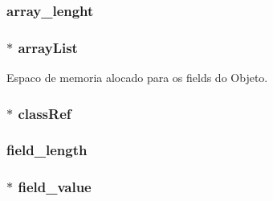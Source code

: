 \subsubsection[{array\+\_\+lenght}]{ array\+\_\+lenght}\label{struct_object__t_ae05c8fe9c6252af97d298b2a2cd87e6c}
\hypertarget{struct_object__t_a11a8bef303b6cb29d8f81e367516e8b8}{}
\subsubsection[{array\+List}]{$\ast$ array\+List}\label{struct_object__t_a11a8bef303b6cb29d8f81e367516e8b8}


Espaco de memoria alocado para os fields do Objeto. 

\hypertarget{struct_object__t_a2b2f7cc877adf1320a6bfa83a3c7696b}{}
\subsubsection[{class\+Ref}]{$\ast$ class\+Ref}\label{struct_object__t_a2b2f7cc877adf1320a6bfa83a3c7696b}
\hypertarget{struct_object__t_a5883165e105ef5c03879572a89675ca0}{}
\subsubsection[{field\+\_\+length}]{ field\+\_\+length}\label{struct_object__t_a5883165e105ef5c03879572a89675ca0}
\hypertarget{struct_object__t_abc71e19d88c36d73f0489da678932851}{}
\subsubsection[{field\+\_\+value}]{$\ast$ field\+\_\+value}\label{struct_object__t_abc71e19d88c36d73f0489da678932851}
\hypertarget{struct_object__t_ae01d16d1ab715a4f5dd1fe8254322594}{}
